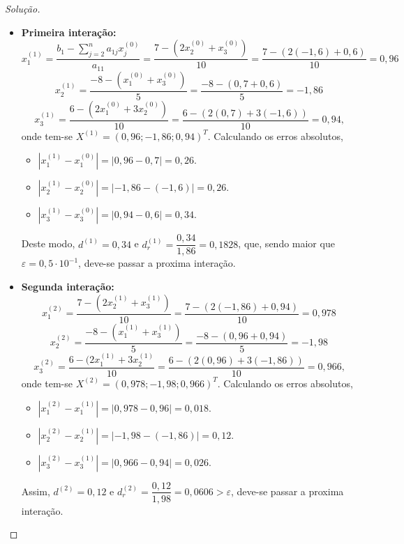 \documentclass[
	12pt,				%
	openright,			%
	twoside,			%
	a4paper,			%
	english,			%
	french,				%
	brazil,				%
	sumario=tradicional
]{abntex2}
\newenvironment{solution}{
	\begin{proof}[Solução]
}{\end{proof}}
\numberwithin{example}{chapter}
\numberwithin{remark}{chapter}
\numberwithin{definition}{chapter}
\numberwithin{figure}{chapter}
\begin{document}
\begin{solution}
	\hfill
	
	\begin{itemize}
	    \item \textbf{Primeira interação:}\hfill
	    $$
	        x_1^{(1)}=\frac{b_1-\displaystyle \sum_{j=2}^n a_{1j}x_j^{(0)}}{a_11}
	        =
	        \frac{7-(2x_2^{(0)} + x_3^{(0)})}{10}
	        =
	        \frac{7-(2(-1,6)+0,6)}{10}
	        =0,96
	    $$
	    $$
	        x_2^{(1)}=\frac{-8-(x_1^{(0)}+x_3^{(0)})}{5}
	        =
	        \frac{-8-(0,7+0,6)}{5}
	        =-1,86
	    $$
	    $$
	        x_3^{(1)}=\frac{6-(2x_1^{(0)}+3x_2^{(0)})}{10}
	        =
	        \frac{6-(2(0,7)+3(-1,6))}{10}
	        =0,94
	        \text{,}
	    $$
	    onde tem-se $X^{(1)}=(0,96; -1,86; 0,94)^T$. Calculando os erros absolutos,
	    \begin{itemize}
	        \item $|x_1^{(1)}-x_1^{(0)}|=|0,96-0,7|=0,26$.
	        \item $|x_2^{(1)}-x_2^{(0)}|=|-1,86-(-1,6)|=0,26$.
	        \item $|x_3^{(1)}-x_3^{(0)}|=|0,94-0,6|=0,34$.
	    \end{itemize}
	    
	    Deste modo, $d^{(1)}=0,34$ e $d_r^{(1)}=\dfrac{0,34}{1,86}=0,1828$, que, sendo maior que $\varepsilon=0,5\cdot 10^{-1}$, deve-se passar a proxima interação.
	
	    \item \textbf{Segunda interação: }\hfill
	    $$
	        x_1^{(2)}=\frac{7-(2x_2^{(1)}+x_3^{(1)})}{10}
	        =
	        \frac{7-(2(-1,86)+0,94)}{10}
	        =0,978
	    $$
	    $$
	        x_2^{(2)}=\frac{-8-(x_1^{(1)}+x_3^{(1)})}{5}
	        =
	        \frac{-8-(0,96+0,94)}{5}
	        =-1,98
	    $$
	    $$
	        x_3^{(2)}=\frac{6-(2x_1^{(1)}+3x_2^{(1)}}{10}
	        =
	        \frac{6-(2(0,96)+3(-1,86))}{10}
	        =0,966
	        \text{,}
	    $$
	    onde tem-se $X^{(2)}=(0,978; -1,98; 0,966)^T$. Calculando os erros absolutos,
	    \begin{itemize}
	        \item $|x_1^{(2)}-x_1^{(1)}|=|0,978-0,96|=0,018$.
	        \item $|x_2^{(2)}-x_2^{(1)}|=|-1,98-(-1,86)|=0,12$.
	        \item $|x_3^{(2)}-x_3^{(1)}|=|0,966-0,94|=0,026$.
	    \end{itemize}
	
	    Assim, $d^{(2)}=0,12$ e $d_r^{(2)}=\dfrac{0,12}{1,98}=0,0606>\varepsilon$, deve-se passar a proxima interação.
	    

\end{itemize}
\end{solution}
\end{document}
